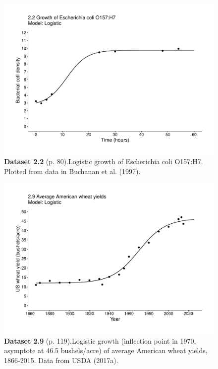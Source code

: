 \documentclass[aps,rmp,preprint,superscriptaddress,10pt,onecolumn]{article}
\begin{document}
\clearpage
\begin{figure}[h]
\includegraphics[width=\textwidth]{output/figs-ggplot/2.2.pdf}
\caption*{\textbf{Dataset 2.2} (p. 80).Logistic growth of Escherichia coli O157:H7. Plotted from data in Buchanan et al. (1997).}
\end{figure}
	
\clearpage
\begin{figure}[h]
\includegraphics[width=\textwidth]{output/figs-ggplot/2.9.pdf}
\caption*{\textbf{Dataset 2.9} (p. 119).Logistic growth (inflection point in 1970, asymptote at 46.5 bushels/acre) of average American wheat yields, 1866-2015. Data from USDA (2017a).}
\end{figure}
	
\end{document}

